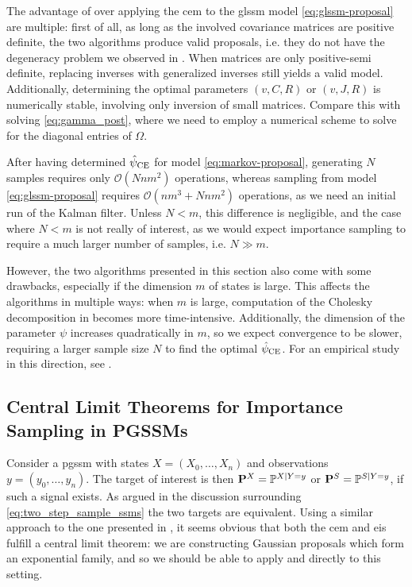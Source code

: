 The advantage of  over applying the \gls{cem} to the \gls{glssm} model \eqref{eq:glssm-proposal} are multiple: first of all, as long as the involved covariance matrices are positive definite, the two algorithms produce valid proposals, i.e. they do not have the degeneracy problem we observed in . When matrices are only positive-semi definite, replacing inverses with generalized inverses still yields a valid model.
Additionally, determining the optimal parameters $(v, C,R)$ or $(v,J,R)$ is numerically stable, involving only inversion of small matrices. Compare this with solving \eqref{eq:gamma_post}, where we need to employ a numerical scheme to solve for the diagonal entries of $\Omega$.

After having determined $\hpce$ for model \eqref{eq:markov-proposal}, generating $N$ samples requires only $\mathcal O(Nnm^{2})$ operations, whereas sampling from model \eqref{eq:glssm-proposal} requires $\mathcal O(nm^{3} + Nnm^{2})$ operations, as we need an initial run of the Kalman filter. Unless $N < m$, this difference is negligible, and the case where $N < m$ is not really of interest, as we would expect importance sampling to require a much larger number of samples, i.e. $N \gg m$. 

However, the two algorithms presented in this section also come with some drawbacks, especially if the dimension $m$ of states is large. This affects the algorithms in multiple ways: when $m$ is large, computation of the Cholesky decomposition in  becomes more time-intensive. Additionally, the dimension of the parameter $\psi$ increases quadratically in $m$, so we expect convergence to be slower, requiring a larger sample size $N$ to find the optimal $\hpce$. For an empirical study in this direction, see .


\subsection{Central Limit Theorems for Importance Sampling in PGSSMs}
\label{subsec:clt_pgssms}

Consider a \gls{pgssm} with states $X = (X_{0}, \dots, X_{n})$ and observations $y = (y_{0}, \dots, y_{n})$. The target of interest is then $\P^{X} = \mathbb P^{X| Y=y}$ or $\P^{S} = \mathbb P^{S | Y=y}$, if such a signal exists. As argued in the discussion surrounding \eqref{eq:two_step_sample_ssms} the two targets are equivalent. Using a similar approach to the one presented in , it seems obvious that both the \gls{cem} and \gls{eis} fulfill a central limit theorem: we are constructing Gaussian proposals which form an exponential family, and so we should be able to apply  and  directly to this setting. 

